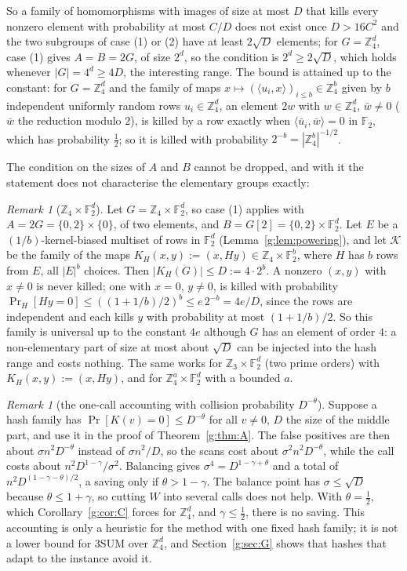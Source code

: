 \documentclass[11pt]{article}
\theoremstyle{definition}
\theoremstyle{remark}
\newtheorem{remark}[theorem]{Remark}
\newcommand{\Z}{\mathbb{Z}}
\newcommand{\F}{\mathbb{F}_2}
\begin{document}
So a family of homomorphisms with images of size at most $D$ that kills every nonzero element with probability at most $C/D$ does not exist once $D>16C^2$ and the two subgroups of case (1) or (2) have at least $2\sqrt D$ elements; for $G=\Z_4^d$, case (1) gives $A=B=2G$, of size $2^d$, so the condition is $2^d\ge2\sqrt D$, which holds whenever $|G|=4^d\ge4D$, the interesting range. The bound is attained up to the constant: for $G=\Z_4^d$ and the family of maps $x\mapsto(\langle u_i,x\rangle)_{i\le b}\in\Z_4^b$ given by $b$ independent uniformly random rows $u_i\in\Z_4^d$, an element $2w$ with $w\in\Z_4^d$, $\bar w\ne0$ ($\bar w$ the reduction modulo $2$), is killed by a row exactly when $\langle\bar u_i,\bar w\rangle=0$ in $\F$, which has probability $\frac12$; so it is killed with probability $2^{-b}=|\Z_4^b|^{-1/2}$.

The condition on the sizes of $A$ and $B$ cannot be dropped, and with it the statement does not characterise the elementary groups exactly:

\begin{remark}[$\Z_4\times\F^d$]\label{g:ex:Z4F2}
Let $G=\Z_4\times\F^d$, so case (1) applies with $A=2G=\{0,2\}\times\{0\}$, of two elements, and $B=G[2]=\{0,2\}\times\F^d$. Let $E$ be a $(1/b)$-kernel-biased multiset of rows in $\F^d$ (Lemma~\ref{g:lem:powering}), and let $\mathcal K$ be the family of the maps $K_H(x,y):=(x,Hy)\in\Z_4\times\F^b$, where $H$ has $b$ rows from $E$, all $|E|^b$ choices. Then $|K_H(G)|\le D:=4\cdot2^b$. A nonzero $(x,y)$ with $x\ne0$ is never killed; one with $x=0$, $y\ne0$, is killed with probability $\Pr_H[Hy=0]\le((1+1/b)/2)^b\le e\,2^{-b}=4e/D$, since the rows are independent and each kills $y$ with probability at most $(1+1/b)/2$. So this family is universal up to the constant $4e$ although $G$ has an element of order $4$: a non-elementary part of size at most about $\sqrt D$ can be injected into the hash range and costs nothing. The same works for $\Z_3\times\F^d$ (two prime orders) with $K_H(x,y):=(x,Hy)$, and for $\Z_4^a\times\F^d$ with a bounded $a$.
\end{remark}

\begin{remark}[the one-call accounting with collision probability $D^{-\theta}$]\label{g:rem:nosaving}
Suppose a hash family has $\Pr[K(v)=0]\le D^{-\theta}$ for all $v\ne0$, $D$ the size of the middle part, and use it in the proof of Theorem~\ref{g:thm:A}. The false positives are then about $\sigma n^2D^{-\theta}$ instead of $\sigma n^2/D$, so the scans cost about $\sigma^2n^2D^{-\theta}$, while the call costs about $n^2D^{1-\gamma}/\sigma^2$. Balancing gives $\sigma^4=D^{1-\gamma+\theta}$ and a total of $n^2D^{(1-\gamma-\theta)/2}$, a saving only if $\theta>1-\gamma$. The balance point has $\sigma\le\sqrt D$ because $\theta\le1+\gamma$, so cutting $W$ into several calls does not help. With $\theta=\frac12$, which Corollary~\ref{g:cor:C} forces for $\Z_4^d$, and $\gamma\le\frac12$, there is no saving. This accounting is only a heuristic for the method with one fixed hash family; it is not a lower bound for 3SUM over $\Z_4^d$, and Section~\ref{g:sec:G} shows that hashes that adapt to the instance avoid it.
\end{remark}
\end{document}
